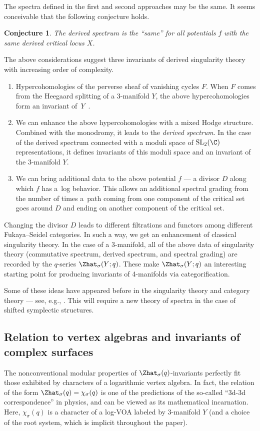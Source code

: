 \documentclass[pdftex]{sigma}
\newtheorem{Conjecture}[Theorem]{Conjecture}
 { \theoremstyle{definition}
\newtheorem{Definition}[Theorem]{Definition}
\newtheorem{Note}[Theorem]{Note}
\newtheorem{Example}[Theorem]{Example}
\newtheorem{Remark}[Theorem]{Remark}
\newtheorem{Question}[Theorem]{Question}
}
\begin{document}
The spectra defined in the first and second approaches may be the same. It seems conceivable that the following conjecture holds.

\begin{Conjecture}
	The derived spectrum is the ``same'' for all potentials $f$ with the same derived critical locus $X$.
\end{Conjecture}

The above considerations suggest three invariants of derived singularity theory with increasing order of complexity.
\begin{enumerate}\itemsep=0pt
	\item[(1)] Hypercohomologies of the perverse sheaf of vanishing cycles $F$. When $F$ comes from the Heegaard splitting of a 3-manifold $Y$, the above hypercohomologies form an invariant of~$Y$~\cite{AbMa20}.

	\item[(2)] We can enhance the above hypercohomologies with a mixed Hodge structure. Combined with the monodromy, it leads to the \emph{derived spectrum}. In the case of the derived spectrum connected with a moduli space of $\operatorname{SL}_2(\C)$ representations, it defines invariants of this moduli space and an invariant of the 3-manifold $Y$.

	\item[(3)] We can bring additional data to the above potential $f$ --- a divisor $D$ along which $f$ has a~log behavior. This allows an additional spectral grading from the number of times a~path coming from one component of the critical set goes around $D$ and ending on another component of the critical set.
\end{enumerate}

Changing the divisor $D$ leads to different filtrations and functors among different Fukaya--Seidel categories.
In such a way, we get an enhancement of classical singularity theory. In the case of a 3-manifold, all of the above data of singularity theory (commutative spectrum, derived spectrum, and spectral grading) are recorded by the $q$-series $\Zhat_{\sigma} (Y;q)$. These make $\Zhat_{\sigma} (Y;q)$ an interesting starting point for producing invariants of 4-manifolds via categorification.

Some of these ideas have appeared before in the singularity theory and category theory --- see, e.g., \cite{FichYin18,Kuz09}. This will require a new theory of spectra in the case of shifted symplectic structures.

\subsection{Relation to vertex algebras and invariants of complex surfaces}\label{sec:ADEVOA}
The nonconventional modular properties of $\Zhat_{\sigma} (q)$-invariants perfectly fit those exhibited by characters of a logarithmic vertex algebra. In fact, the relation of the form
$
	\Zhat_{\sigma} (q) = \chi_{\sigma} (q)
$
is one of the predictions of the so-called ``3d-3d correspondence'' in physics, and can be viewed as its mathematical incarnation. Here, $\chi_{\sigma} (q)$ is a character of a log-VOA labeled by 3-manifold $Y$ (and a choice of the root system, which is implicit throughout the paper).
\end{document}
